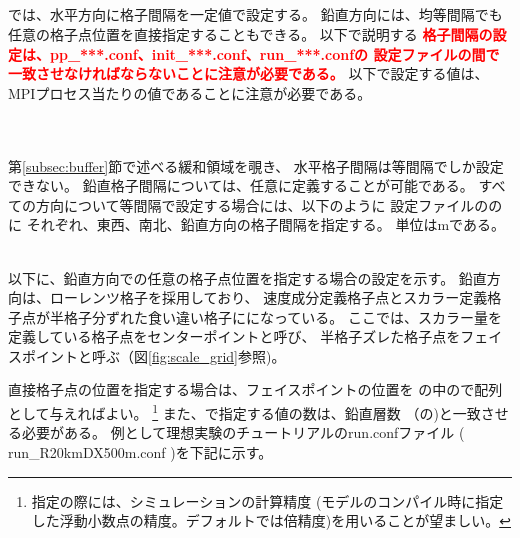 \subsection{\SubsecGridIntvSettng} \label{subsec:gridinterv}
\scalerm では、水平方向に格子間隔を一定値で設定する。
鉛直方向には、均等間隔でも任意の格子点位置を直接指定することもできる。
以下で説明する
\textcolor{red}{\bf 格子間隔の設定は、pp\_***.conf、init\_***.conf、run\_***.confの
設定ファイルの間で一致させなければならないことに注意が必要である。}
以下で設定する値は、MPIプロセス当たりの値であることに注意が必要である。

~\\
~\\

第\ref{subsec:buffer}節で述べる緩和領域を覗き、
水平格子間隔は等間隔でしか設定できない。
鉛直格子間隔については、任意に定義することが可能である。
すべての方向について等間隔で設定する場合には、以下のように
設定ファイルののに
それぞれ、東西、南北、鉛直方向の格子間隔を指定する。
単位はmである。

\\


以下に、鉛直方向での任意の格子点位置を指定する場合の設定を示す。
鉛直方向は、ローレンツ格子を採用しており、
速度成分定義格子点とスカラー定義格子点が半格子分ずれた食い違い格子にになっている。
ここでは、スカラー量を定義している格子点をセンターポイントと呼び、
半格子ズレた格子点をフェイスポイントと呼ぶ（図\ref{fig:scale_grid}参照)。

直接格子点の位置を指定する場合は、フェイスポイントの位置を
の中ので配列として与えればよい。
\footnote{指定の際には、シミュレーションの計算精度
(モデルのコンパイル時に指定した浮動小数点の精度。デフォルトでは倍精度)を用いることが望ましい。}
また、で指定する値の数は、鉛直層数
（の)と一致させる必要がある。
例として理想実験のチュートリアルのrun.confファイル
( run\_R20kmDX500m.conf )を下記に示す。

